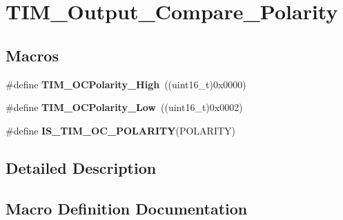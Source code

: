 \hypertarget{group___t_i_m___output___compare___polarity}{}\section{T\+I\+M\+\_\+\+Output\+\_\+\+Compare\+\_\+\+Polarity}
\label{group___t_i_m___output___compare___polarity}
\subsection*{Macros}
\begin{DoxyCompactItemize}
\item 
\#define {\bfseries T\+I\+M\+\_\+\+O\+C\+Polarity\+\_\+\+High}~((uint16\+\_\+t)0x0000)\hypertarget{group___t_i_m___output___compare___polarity_gaba2f2de6fd722b8973e0eddeb8644022}{}\label{group___t_i_m___output___compare___polarity_gaba2f2de6fd722b8973e0eddeb8644022}

\item 
\#define {\bfseries T\+I\+M\+\_\+\+O\+C\+Polarity\+\_\+\+Low}~((uint16\+\_\+t)0x0002)\hypertarget{group___t_i_m___output___compare___polarity_ga9f4b11953dbd2c6f836b6913469dcf54}{}\label{group___t_i_m___output___compare___polarity_ga9f4b11953dbd2c6f836b6913469dcf54}

\item 
\#define {\bfseries I\+S\+\_\+\+T\+I\+M\+\_\+\+O\+C\+\_\+\+P\+O\+L\+A\+R\+I\+TY}(P\+O\+L\+A\+R\+I\+TY)
\end{DoxyCompactItemize}


\subsection{Detailed Description}


\subsection{Macro Definition Documentation}
